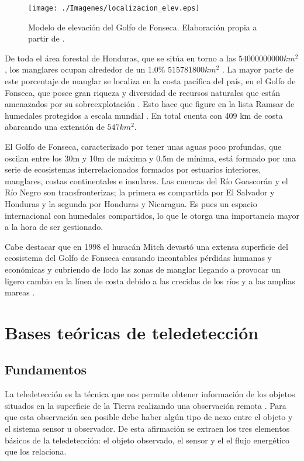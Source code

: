 \begin{figure}
	\centering
	\texttt{[image: ./Imagenes/localizacion\_elev.eps]}
	\caption[Modelo de elevación del Golfo de Fonseca]{Modelo de elevación del Golfo de Fonseca. Elaboración propia a partir de \cite{SRTM2008}.}
	\label{fig:elevacion}
\end{figure}

De toda el área forestal de Honduras, que se sitúa en torno a las $54000000000 km^{2}$, los manglares ocupan alrededor de un 1.0\% $515781800 km^{2}$ \citep{anuario2013}. La mayor parte de este porcentaje de manglar se localiza en la costa pacífica del país, en el Golfo de Fonseca, que posee gran riqueza y diversidad de recursos naturales que están amenazados por su sobreexplotación \citep{Jimenez1994}. Esto hace que figure en la lista Ramsar de humedales protegidos a escala mundial \citep{Ramsar2014}. En total cuenta con 409 km de costa abarcando una extensión de $547 km^{2}$.\Sep

El Golfo de Fonseca, caracterizado por tener unas aguas poco profundas, que oscilan entre los 30m y 10m de máxima y 0.5m de mínima, está formado por una serie de ecosistemas interrelacionados formados por estuarios interiores, manglares, costas continentales e insulares. Las cuencas del Río Goascorán y el Río Negro son transfronterizas; la primera es compartida por El Salvador y Honduras y la segunda por Honduras y Nicaragua. Es pues un espacio internacional con humedales compartidos, lo que le otorga una importancia mayor a la hora de ser gestionado.\Sep

Cabe destacar que en 1998 el huracán Mitch devastó una extensa superficie del ecosistema del Golfo de Fonseca causando incontables pérdidas humanas y económicas y cubriendo de lodo las zonas de manglar llegando a provocar un ligero cambio en la línea de costa debido a las crecidas de los ríos y a las amplias mareas \citep{mexico1999honduras}.

\section{Bases teóricas de teledetección} \label{sec:bases}
\subsection{Fundamentos} \label{subsec:fundamentos}
La teledetección es la técnica que nos permite obtener información de los objetos situados en la superficie de la Tierra realizando una observación remota \citep{Curran1991Longman} \citep{chuvieco2002teledeteccion} \citep{schowengerdt2006}. Para que esta observación sea posible debe haber algún tipo de nexo entre el objeto y el sistema sensor u observador. De esta afirmación se extraen los tres elementos básicos de la teledetección: el objeto observado, el sensor y el el flujo energético que los relaciona.\Sep

